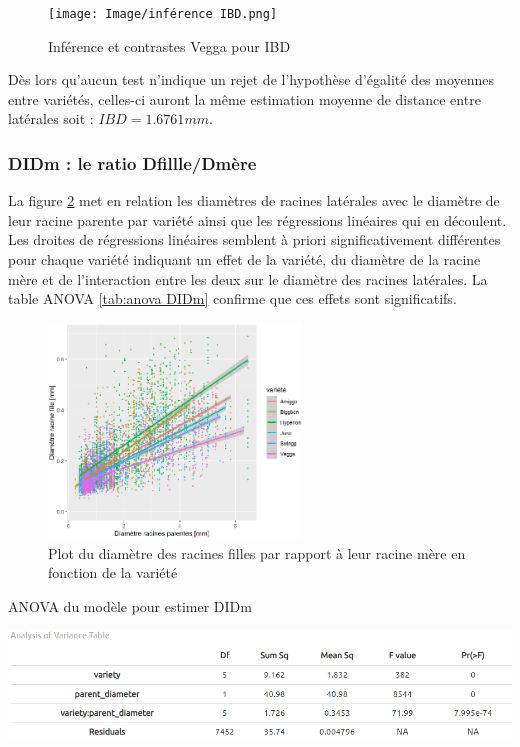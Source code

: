 \begin{figure}[ht]
\centering
\texttt{[image: Image/inférence IBD.png]}
\caption{Inférence et contrastes Vegga pour IBD}
\label{fig:inférence IBD}
\end{figure}

Dès lors qu'aucun test n'indique un rejet de l'hypothèse d'égalité des moyennes entre variétés, celles-ci auront la même estimation moyenne de distance entre latérales soit : $IBD=1.6761 mm$.

\subsubsection{DIDm : le ratio Dfillle/Dmère}

La figure \ref{fig:plot DIDm} met en relation les diamètres de racines latérales avec le diamètre de leur racine parente par variété ainsi que les régressions linéaires qui en découlent.
Les droites de régressions linéaires semblent à priori significativement différentes pour chaque variété indiquant un effet de la variété, du diamètre de la racine mère et de l'interaction entre les deux sur le diamètre des racines latérales.
La table ANOVA \ref{tab:anova DIDm} confirme que ces effets sont significatifs.
\newpage

\begin{figure}[ht]
\centering
\includegraphics[width=0.6\textwidth]{Image/plot DIDm.png}
\caption{Plot du diamètre des racines filles par rapport à leur racine mère en fonction de la variété}
\label{fig:plot DIDm}
\end{figure}

\begin{table}[ht]
    \centering
    \caption{ANOVA du modèle pour estimer DIDm}
    \includegraphics[width=1\textwidth]{Image/anova DIDm.png}
    \label{tab:anova DIDm}
\end{table}


